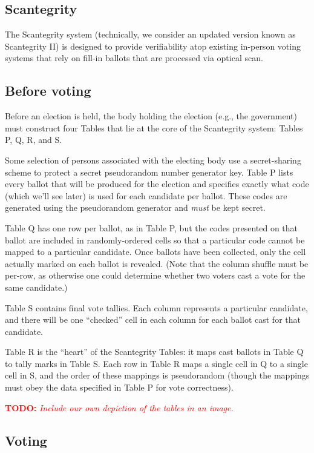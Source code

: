 \documentclass[10pt]{article}
\newcommand{\todo}[1]{\textcolor{red}{\textbf{TODO:} \emph{#1}}}
\begin{document}
\begin{multicols}{2}
\section{Scantegrity}

The Scantegrity system \cite{scantegrity_ii} (technically, we consider an updated version known as
Scantegrity II) is designed to provide verifiability atop existing in-person voting systems that
rely on fill-in ballots that are processed via optical scan.

\subsection{Before voting}

Before an election is held, the body holding the election (e.g., the government) must construct four
Tables that lie at the core of the Scantegrity system: Tables P, Q, R, and S.

Some selection of persons associated with the electing body use a secret-sharing scheme to protect a
secret pseudorandom number generator key. Table P lists every ballot that will be produced for the
election and specifies exactly what code (which we'll see later) is used for each candidate per
ballot. These codes are generated using the pseudorandom generator and \emph{must} be kept secret.

Table Q has one row per ballot, as in Table P, but the codes presented on that ballot are included
in randomly-ordered cells so that a particular code cannot be mapped to a particular candidate.
Once ballots have been collected, only the cell actually marked on each ballot is revealed. (Note
that the column shuffle must be per-row, as otherwise one could determine whether two voters
cast a vote for the same candidate.)

Table S contains final vote tallies. Each column represents a particular candidate, and there will
be one ``checked'' cell in each column for each ballot cast for that candidate.

Table R is the ``heart'' of the Scantegrity Tables: it maps cast ballots in Table Q to tally marks
in Table S. Each row in Table R maps a single cell in Q to a single cell in S, and the order of
these mappings is pseudorandom (though the mappings must obey the data specified in Table P for vote
correctness).

\todo{Include our own depiction of the tables in an image.}

\subsection{Voting}


\end{multicols}
\end{document}
